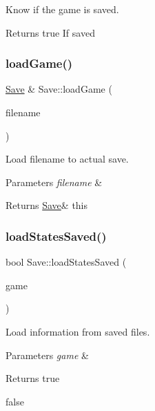 Know if the game is saved. 

\begin{DoxyReturn}{Returns}
true If saved 
\end{DoxyReturn}
\mbox{\label{class_save_af278065bd4e223f0681f1e496dc61da6}} 
\subsubsection{\texorpdfstring{load\+Game()}{loadGame()}}
{\footnotesize\ttfamily \hyperlink{class_save}{Save} \& Save\+::load\+Game (\begin{DoxyParamCaption}\item[{std\+::string}]{filename }\end{DoxyParamCaption})\hspace{0.3cm}{\ttfamily [static]}}



Load filename to actual save. 


\begin{DoxyParams}{Parameters}
{\em filename} & \\
\hline
\end{DoxyParams}
\begin{DoxyReturn}{Returns}
\hyperlink{class_save}{Save}\& this 
\end{DoxyReturn}
\mbox{\label{class_save_aa9264e3e576763299af4df148700e266}} 
\subsubsection{\texorpdfstring{load\+States\+Saved()}{loadStatesSaved()}}
{\footnotesize\ttfamily bool Save\+::load\+States\+Saved (\begin{DoxyParamCaption}\item[{\hyperlink{class_scene_game}{Scene\+Game} \&}]{game }\end{DoxyParamCaption})\hspace{0.3cm}{\ttfamily [static]}}



Load information from saved files. 


\begin{DoxyParams}{Parameters}
{\em game} & \\
\hline
\end{DoxyParams}
\begin{DoxyReturn}{Returns}
true 

false 
\end{DoxyReturn}
\mbox{\label{class_save_aee5c805551d1a4492c3a44a3645343b6}} 
